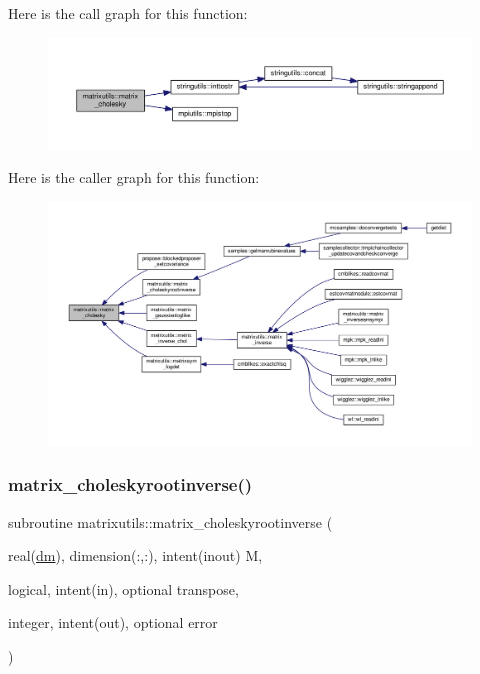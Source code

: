 Here is the call graph for this function\+:
\nopagebreak
\begin{figure}[H]
\begin{center}
\leavevmode
\includegraphics[width=350pt]{namespacematrixutils_a380ecdd4310ae2f91be911a45516df12_cgraph}
\end{center}
\end{figure}
Here is the caller graph for this function\+:
\nopagebreak
\begin{figure}[H]
\begin{center}
\leavevmode
\includegraphics[width=350pt]{namespacematrixutils_a380ecdd4310ae2f91be911a45516df12_icgraph}
\end{center}
\end{figure}
\mbox{\label{namespacematrixutils_acda49677dcf7603b255acba37dda9b92}} 
\subsubsection{\texorpdfstring{matrix\+\_\+choleskyrootinverse()}{matrix\_choleskyrootinverse()}}
{\footnotesize\ttfamily subroutine matrixutils\+::matrix\+\_\+choleskyrootinverse (\begin{DoxyParamCaption}\item[{real(\mbox{\hyperlink{namespacematrixutils_a7bdc564986ea4d90f51201c75606ef3d}{dm}}), dimension(\+:,\+:), intent(inout)}]{M,  }\item[{logical, intent(in), optional}]{transpose,  }\item[{integer, intent(out), optional}]{error }\end{DoxyParamCaption})}




